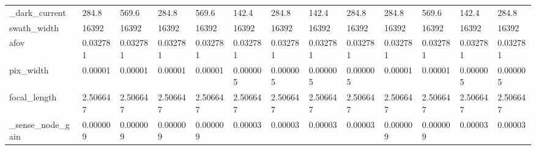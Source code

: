 \begin{table}
\begin{tabular}{lllllllllllll}
\_dark\_current          &     284.8 &     569.6 &     284.8 &     569.6 &     142.4 &     284.8 &     142.4 &     284.8 &     284.8 &     569.6 &     142.4 &     284.8 \\
swath\_width            &     16392 &     16392 &     16392 &     16392 &     16392 &     16392 &     16392 &     16392 &     16392 &     16392 &     16392 &     16392 \\
afov                   &  0.032781 &  0.032781 &  0.032781 &  0.032781 &  0.032781 &  0.032781 &  0.032781 &  0.032781 &  0.032781 &  0.032781 &  0.032781 &  0.032781 \\
pix\_width              &   0.00001 &   0.00001 &   0.00001 &   0.00001 &  0.000005 &  0.000005 &  0.000005 &  0.000005 &   0.00001 &   0.00001 &  0.000005 &  0.000005 \\
focal\_length           &  2.506647 &  2.506647 &  2.506647 &  2.506647 &  2.506647 &  2.506647 &  2.506647 &  2.506647 &  2.506647 &  2.506647 &  2.506647 &  2.506647 \\
\_sense\_node\_gain       &  0.000009 &  0.000009 &  0.000009 &  0.000009 &   0.00003 &   0.00003 &   0.00003 &   0.00003 &  0.000009 &  0.000009 &   0.00003 &   0.00003 \\
\bottomrule
\end{tabular}
\end{table}
